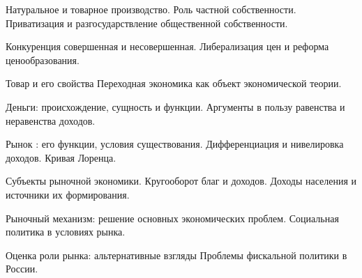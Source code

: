 \newpage


\shapkFull
\setcounter{zad}{0}

\z 	Натуральное и товарное производство. Роль частной собственности.
 \medskip
\z 	Приватизация и разгосударствление общественной собственности.
 \medskip

\newpage


\shapkFull
\setcounter{zad}{0}

\z 	Конкуренция совершенная и несовершенная.
 \medskip
\z 	Либерализация цен и реформа ценообразования.
 \medskip

\newpage


\shapkFull
\setcounter{zad}{0}

\z 	Товар и его свойства
 \medskip
\z 	Переходная экономика как объект экономической теории.
 \medskip

\newpage


\shapkFull
\setcounter{zad}{0}

\z 	Деньги: происхождение, сущность и функции.
 \medskip
\z 	Аргументы в пользу равенства и неравенства доходов.
 \medskip

\newpage


\shapkFull
\setcounter{zad}{0}

\z 	Рынок : его функции, условия существования.
 \medskip
\z 	Дифференциация и нивелировка доходов.  Кривая Лоренца.
 \medskip

\newpage


\shapkFull
\setcounter{zad}{0}

\z 	Субъекты рыночной экономики.  Кругооборот благ и доходов.
 \medskip
\z 	Доходы населения и источники их  формирования.
 \medskip

\newpage


\shapkFull
\setcounter{zad}{0}

\z 	Рыночный механизм: решение основных экономических проблем.
 \medskip
\z 	Социальная политика в условиях рынка.
 \medskip

\newpage


\shapkFull
\setcounter{zad}{0}

\z 	Оценка роли рынка: альтернативные взгляды
 \medskip
\z 	Проблемы фискальной политики в России.
 \medskip

